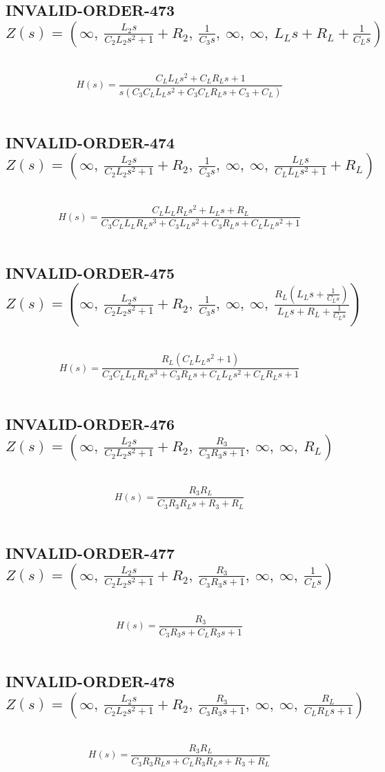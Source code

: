 \documentclass{article}
\begin{document}
\subsection{INVALID-ORDER-473 $Z(s) = \left( \infty, \  \frac{L_{2} s}{C_{2} L_{2} s^{2} + 1} + R_{2}, \  \frac{1}{C_{3} s}, \  \infty, \  \infty, \  L_{L} s + R_{L} + \frac{1}{C_{L} s}\right)$ } \ 
\textbf{\[H(s) = \frac{C_{L} L_{L} s^{2} + C_{L} R_{L} s + 1}{s \left(C_{3} C_{L} L_{L} s^{2} + C_{3} C_{L} R_{L} s + C_{3} + C_{L}\right)}\] } \ 
\subsection{INVALID-ORDER-474 $Z(s) = \left( \infty, \  \frac{L_{2} s}{C_{2} L_{2} s^{2} + 1} + R_{2}, \  \frac{1}{C_{3} s}, \  \infty, \  \infty, \  \frac{L_{L} s}{C_{L} L_{L} s^{2} + 1} + R_{L}\right)$ } \ 
\textbf{\[H(s) = \frac{C_{L} L_{L} R_{L} s^{2} + L_{L} s + R_{L}}{C_{3} C_{L} L_{L} R_{L} s^{3} + C_{3} L_{L} s^{2} + C_{3} R_{L} s + C_{L} L_{L} s^{2} + 1}\] } \ 
\subsection{INVALID-ORDER-475 $Z(s) = \left( \infty, \  \frac{L_{2} s}{C_{2} L_{2} s^{2} + 1} + R_{2}, \  \frac{1}{C_{3} s}, \  \infty, \  \infty, \  \frac{R_{L} \left(L_{L} s + \frac{1}{C_{L} s}\right)}{L_{L} s + R_{L} + \frac{1}{C_{L} s}}\right)$ } \ 
\textbf{\[H(s) = \frac{R_{L} \left(C_{L} L_{L} s^{2} + 1\right)}{C_{3} C_{L} L_{L} R_{L} s^{3} + C_{3} R_{L} s + C_{L} L_{L} s^{2} + C_{L} R_{L} s + 1}\] } \ 
\subsection{INVALID-ORDER-476 $Z(s) = \left( \infty, \  \frac{L_{2} s}{C_{2} L_{2} s^{2} + 1} + R_{2}, \  \frac{R_{3}}{C_{3} R_{3} s + 1}, \  \infty, \  \infty, \  R_{L}\right)$ } \ 
\textbf{\[H(s) = \frac{R_{3} R_{L}}{C_{3} R_{3} R_{L} s + R_{3} + R_{L}}\] } \ 
\subsection{INVALID-ORDER-477 $Z(s) = \left( \infty, \  \frac{L_{2} s}{C_{2} L_{2} s^{2} + 1} + R_{2}, \  \frac{R_{3}}{C_{3} R_{3} s + 1}, \  \infty, \  \infty, \  \frac{1}{C_{L} s}\right)$ } \ 
\textbf{\[H(s) = \frac{R_{3}}{C_{3} R_{3} s + C_{L} R_{3} s + 1}\] } \ 
\subsection{INVALID-ORDER-478 $Z(s) = \left( \infty, \  \frac{L_{2} s}{C_{2} L_{2} s^{2} + 1} + R_{2}, \  \frac{R_{3}}{C_{3} R_{3} s + 1}, \  \infty, \  \infty, \  \frac{R_{L}}{C_{L} R_{L} s + 1}\right)$ } \ 
\textbf{\[H(s) = \frac{R_{3} R_{L}}{C_{3} R_{3} R_{L} s + C_{L} R_{3} R_{L} s + R_{3} + R_{L}}\] } \ 
\end{document}
